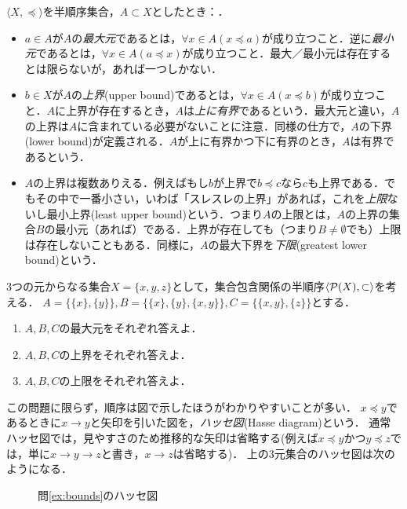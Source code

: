 \documentclass[dvipdfmx,11pt,a4paper]{jsarticle}
\begin{document}
$\langle X, \preceq \rangle$を半順序集合，$A \subset X$としたとき：．
\begin{itemize}
 \item $a \in A$が$A$の\emph{最大元}であるとは，$\forall x \in A (x \preceq a)$が成り立つこと．逆に\emph{最小元}であるとは，$\forall x \in A (a \preceq x)$が成り立つこと．最大／最小元は存在するとは限らないが，あれば一つしかない．
 \item $b \in X$が$A$の\emph{上界}(upper bound)であるとは，$\forall x \in A (x \preceq b)$が成り立つこと．$A$に上界が存在するとき，$A$は\emph{上に有界}であるという．最大元と違い，$A$の上界は$A$に含まれている必要がないことに注意．同様の仕方で，$A$の下界(lower bound)が定義される．$A$が上に有界かつ下に有界のとき，$A$は有界であるという．
 \item $A$の上界は複数ありえる．例えばもし$b$が上界で$b \preceq c$なら$c$も上界である．でもその中で一番小さい，いわば「スレスレの上界」があれば，これを\emph{上限}ないし最小上界(least upper bound)という．つまり$A$の上限とは，$A$の上界の集合$B$の最小元（あれば）である．上界が存在しても（つまり$B \neq \emptyset$でも）上限は存在しないこともある．同様に，$A$の最大下界を\emph{下限}(greatest lower bound)という．
\end{itemize}

\begin{exercise} \label{ex:bounds}
3つの元からなる集合$X = \{x, y, z\}$として，集合包含関係の半順序$\langle \mathcal{P}(X), \subset \rangle$を考える．
$A = \{ \{x\}, \{y\} \}, B = \{ \{x\}, \{y\}, \{x, y\} \}, C = \{ \{x,y\}, \{z\} \}$とする．
\begin{enumerate}
 \item $A, B, C$の最大元をそれぞれ答えよ．%
 \item $A, B, C$の上界をそれぞれ答えよ．  %
 \item $A, B, C$の上限をそれぞれ答えよ．  %
\end{enumerate}
\end{exercise}

この問題に限らず，順序は図で示したほうがわかりやすいことが多い．
$x \preceq y$であるときに$x \to y$と矢印を引いた図を，\emph{ハッセ図}(Hasse diagram)という．
通常ハッセ図では，見やすさのため推移的な矢印は省略する(例えば$x \preceq y$かつ$y \preceq z$では，単に$x \to y \to z$と書き，$x \to z$は省略する)．
上の3元集合のハッセ図は次のようになる．
\begin{figure}[h]
\centering
{}
\caption{問\ref{ex:bounds}のハッセ図}
\label{fig:hasse} 
\end{figure}
\end{document}
